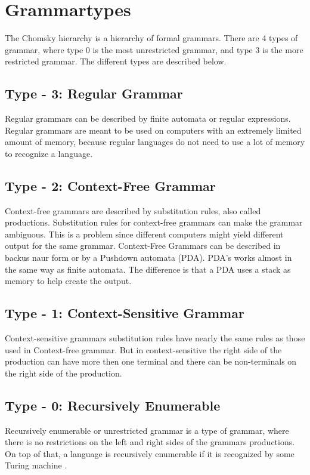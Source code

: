 \section{Grammartypes}
The Chomsky hierarchy is a hierarchy of formal grammars. There are 4 types of grammar, where type 0 is the most unrestricted grammar, and type 3 is the more restricted grammar. The different types are described below. \citep{Chomsky}

\subsection{Type - 3: Regular Grammar}
Regular grammars can be described by finite automata or regular expressions. Regular grammars are meant to be used on computers with an extremely limited amount of memory, because regular languages do not need to use a lot of memory to recognize a language\citep{sipser}.

\subsection{Type - 2: Context-Free Grammar}
Context-free grammars are described by substitution rules, also called productions. Substitution rules for context-free grammars can make the grammar ambiguous.
This is a problem since different computers might yield different output for the same grammar.
Context-Free Grammars can be described in backus naur form or by a Pushdown automata (PDA). PDA's works almost in the same way as finite automata. The difference is that a PDA uses a stack as memory to help create the output\citep{sipser}. 

\subsection{Type - 1: Context-Sensitive Grammar}
Context-sensitive grammars substitution rules have nearly the same rules as those used in Context-free grammar. But in context-sensitive the right side of the production can have more then one terminal and there can be non-terminals on the right side of the production. 

\subsection{Type - 0: Recursively Enumerable}
Recursively enumerable or unrestricted grammar is a type of grammar, where there is no restrictions on the left and right sides of the grammars productions. On top of that, a language is recursively enumerable if it is recognized by some Turing machine \citep{sipser}.  %

